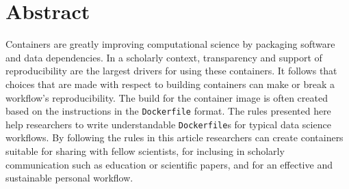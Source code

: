 \documentclass[10pt,letterpaper]{article}
\newcommand{\getIndex}[2]{
  \ForEach{,}{\IfEq{#1}{\thislevelitem}{\number\thislevelcount\ExitForEach}{}}{#2}
}
\newcommand{\getAff}[1]{
  \getIndex{#1}{}
}
\begin{document}
\vspace*{0.2in}

\section*{Abstract}
Containers are greatly improving computational science by packaging
software and data dependencies. In a scholarly context, transparency and
support of reproducibility are the largest drivers for using these
containers. It follows that choices that are made with respect to
building containers can make or break a workflow's reproducibility. The
build for the container image is often created based on the instructions
in the \texttt{Dockerfile} format. The rules presented here help
researchers to write understandable \texttt{Dockerfile}s for typical
data science workflows. By following the rules in this article
researchers can create containers suitable for sharing with fellow
scientists, for inclusing in scholarly communication such as education
or scientific papers, and for an effective and sustainable personal
workflow.
\end{document}

